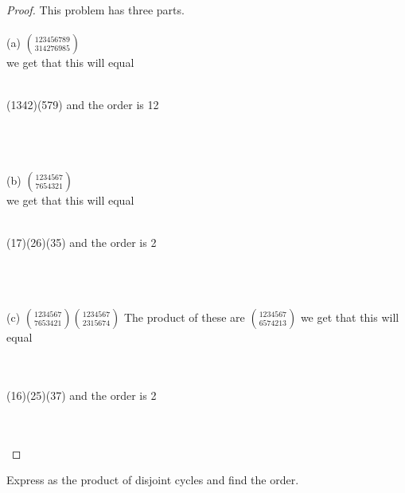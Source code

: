 \documentclass[12pt]{article}
\newenvironment{problem}[2][Problem]{\begin{trivlist}
\item[\hskip \labelsep {\bfseries #1}\hskip \labelsep {\bfseries #2.}]}{\end{trivlist}}
\begin{document}
\begin{proof}
This problem has three parts. \\ \\
(a) $\displaystyle{123456789 \choose 314276985}$ \\ 
we get that this will equal \\ \\
\centerline{(1342)(579) and the order is 12} \\ \\ \\
(b) $\displaystyle{1234567 \choose 7654321}$ \\
we get that this will equal \\ \\
\centerline{(17)(26)(35) and the order is 2} \\ \\ \\
(c) $\displaystyle{1234567 \choose 7653421} \displaystyle{1234567 \choose 2315674}$
The product of these are $\displaystyle{1234567 \choose 6574213}$
we get that this will equal \\ \\ \\
\centerline{(16)(25)(37) and the order is 2} \\ \\ 

\end{proof}

\begin{problem}{3.2.3}
Express as the product of disjoint cycles and find the order.
\end{problem}
\end{document}
